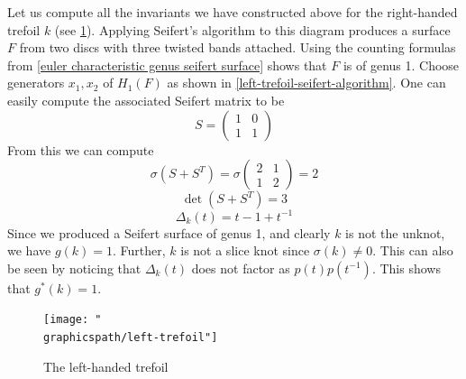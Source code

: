 \begin{example}
Let us compute all the invariants we have constructed above for the right-handed trefoil $k$ (see \cref{left-handed-trefoil}). Applying Seifert's algorithm to this diagram produces a surface $F$ from two discs with three twisted bands attached. Using the counting formulas from \ref{euler characteristic genus seifert surface} shows that $F$ is of genus 1. Choose generators $x_1,x_2$ of $H_1(F)$ as shown in \cref{left-trefoil-seifert-algorithm}. One can easily compute the associated Seifert matrix to be
\[ S = \begin{pmatrix} 1 & 0 \\ 1 & 1 \end{pmatrix} \]
From this we can compute
\[ \sigma(S+S^T) = \sigma\begin{pmatrix} 2 & 1 \\ 1 & 2 \end{pmatrix} = 2 \]
\[ \det(S+S^T) = 3 \]
\[ \Delta_k(t) = t - 1 + t^{-1} \]
Since we produced a Seifert surface of genus 1, and clearly $k$ is not the unknot, we have $g(k) = 1$. Further, $k$ is not a slice knot since $\sigma(k) \neq 0$. This can also be seen by noticing that $\Delta_k(t)$ does not factor as $p(t)p(t^{-1})$. This shows that $g^*(k)=1$.

\begin{figure}
\centering
\texttt{[image: "\\graphicspath/left-trefoil"]}
\caption{The left-handed trefoil}
\label{left-handed-trefoil}
\end{figure}


\end{example}

